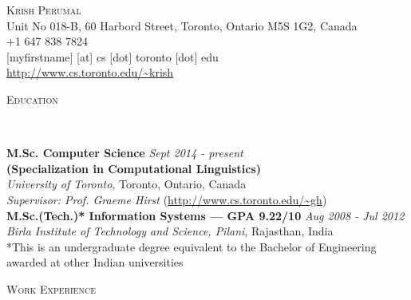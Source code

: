 \documentclass[11pt]{article}
\newenvironment{changemargin}[2]{%
  \begin{list}{}{%
    \setlength{\topsep}{0pt}%
    \setlength{\leftmargin}{#1}%
    \setlength{\rightmargin}{#2}%
    \setlength{\listparindent}{\parindent}%
    \setlength{\itemindent}{\parindent}%
    \setlength{\parsep}{\parskip}%
  }%
  \item[]}{\end{list}
}
\newcommand{\lineover}{
	\begin{changemargin}{-0.05in}{-0.05in}
		\vspace*{-8pt}
		\hrulefill \\
		\vspace*{-2pt}
	\end{changemargin}
}
\newcommand{\header}[1]{
	\begin{changemargin}{-0.5in}{-0.5in}
		\scshape{#1}\\
  	\lineover
	\end{changemargin}
}
\newcommand{\contact}[5]{
	\begin{changemargin}{-0.5in}{-0.5in}
		\begin{center}
			{\Large \scshape {#1}}\\ \smallskip
			{#2}\\ \smallskip 
			{#3}\\ \smallskip
			{#4}\\ \smallskip
			{#5}\\ \smallskip
		\end{center}
	\end{changemargin}
}
\newenvironment{body} {
	\vspace*{-16pt}
	\begin{changemargin}{-0.25in}{-0.5in}
  }	
	{\end{changemargin}
}
\begin{document}
\contact{Krish Perumal}{Unit No 018-B, 60 Harbord Street, Toronto, Ontario M5S 1G2, Canada}{+1 647 838 7824}{[myfirstname] [at] cs [dot] toronto [dot] edu}{\url{http://www.cs.toronto.edu/~krish}}

% 
% 


\header{Education}

\begin{body}
	\vspace{14pt}
	\textbf{M.Sc. Computer Science}{} \hfill \emph{Sept 2014 - present}{} \\
    \textbf{(Specialization in Computational Linguistics)} \\
	\emph{University of Toronto}, Toronto, Ontario, Canada{} \\
    \emph{Supervisor: Prof. Graeme Hirst} (\url{http://www.cs.toronto.edu/~gh}) \\
	\smallskip
	\vspace{14pt}
	\textbf{M.Sc.(Tech.)* Information Systems --- GPA 9.22/10}{} \hfill \emph{Aug 2008 - Jul 2012}{} \\
	\emph{Birla Institute of Technology and Science, Pilani}, Rajasthan, India{} \\
	\smallskip
	\scriptsize{*This is an undergraduate degree equivalent to the Bachelor of Engineering awarded at other Indian universities} \\
\end{body}

\smallskip


\header{Work Experience}
\end{document}
